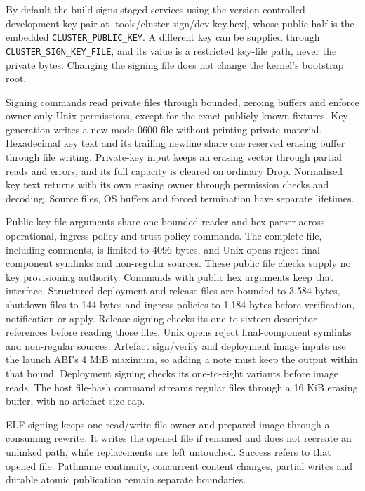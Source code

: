 By default the build signs staged services using the
version-controlled development key-pair at
\repofile|tools/cluster-sign/dev-key.hex|, whose public half is the embedded
\texttt{CLUSTER\_PUBLIC\_KEY}. A different key can be supplied through
\texttt{CLUSTER\_SIGN\_KEY\_FILE}, and its value is a restricted key-file path,
never the private bytes. Changing the signing file does not change the
kernel's bootstrap root.

Signing commands read private files through bounded,
zeroing buffers and enforce owner-only Unix permissions, except for the
exact publicly known fixtures. Key generation writes a new mode-0600 file
without printing private material. Hexadecimal key text and its trailing newline
share one reserved erasing buffer through file writing. Private-key input
keeps an erasing vector through partial reads and errors, and its full capacity
is cleared on ordinary Drop. Normalised key text returns with its own erasing
owner through permission checks and decoding. Source files, OS buffers and
forced termination have separate lifetimes.

Public-key file arguments share one bounded reader and hex parser across
operational, ingress-policy and trust-policy commands. The complete file,
including comments, is limited to 4096 bytes, and Unix opens reject final-component
symlinks and non-regular sources. These public file checks supply no key
provisioning authority. Commands with public hex arguments keep that interface.
Structured deployment and release files are bounded to 3,584 bytes, shutdown
files to 144 bytes and ingress policies to 1,184 bytes before verification,
notification or apply. Release signing checks its one-to-sixteen descriptor
references before reading those files. Unix opens reject final-component
symlinks and non-regular sources. Artefact sign/verify and deployment image
inputs use the launch ABI's 4 MiB maximum, so adding a note must keep the output
within that bound. Deployment signing checks its one-to-eight variants before
image reads. The host file-hash command streams regular files through a 16 KiB
erasing buffer, with no artefact-size cap.

ELF signing keeps one read/write
file owner and prepared image through a consuming rewrite. It writes the opened
file if renamed and does not recreate an unlinked path, while replacements are left
untouched. Success refers to that opened file. Pathname continuity, concurrent
content changes, partial writes and durable atomic publication remain separate
boundaries.


